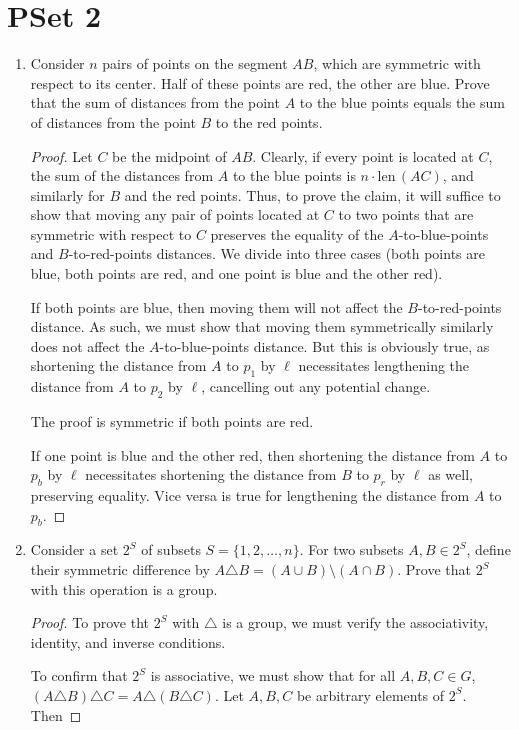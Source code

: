 \documentclass[../main.tex]{subfiles}
\begin{document}
\section{PSet 2}
\begin{enumerate}
    \item {}Consider $n$ pairs of points on the segment $AB$, which are symmetric with respect to its center. Half of these points are red, the other are blue. Prove that the sum of distances from the point $A$ to the blue points equals the sum of distances from the point $B$ to the red points.
    \begin{proof}
        Let $C$ be the midpoint of $AB$. Clearly, if every point is located at $C$, the sum of the distances from $A$ to the blue points is $n\cdot\text{len}\,(AC)$, and similarly for $B$ and the red points. Thus, to prove the claim, it will suffice to show that moving any pair of points located at $C$ to two points that are symmetric with respect to $C$ preserves the equality of the $A$-to-blue-points and $B$-to-red-points distances. We divide into three cases (both points are blue, both points are red, and one point is blue and the other red).\par
        If both points are blue, then moving them will not affect the $B$-to-red-points distance. As such, we must show that moving them symmetrically similarly does not affect the $A$-to-blue-points distance. But this is obviously true, as shortening the distance from $A$ to $p_1$ by $\ell$ necessitates lengthening the distance from $A$ to $p_2$ by $\ell$, cancelling out any potential change.\par
        The proof is symmetric if both points are red.\par
        If one point is blue and the other red, then shortening the distance from $A$ to $p_b$ by $\ell$ necessitates shortening the distance from $B$ to $p_r$ by $\ell$ as well, preserving equality. Vice versa is true for lengthening the distance from $A$ to $p_b$.
    \end{proof}
    \item Consider a set $2^S$ of subsets $S=\{1,2,\dots,n\}$. For two subsets $A,B\in 2^S$, define their symmetric difference by $A\triangle B=(A\cup B)\setminus(A\cap B)$. Prove that $2^S$ with this operation is a group.
    \begin{proof}
        To prove tht $2^S$ with $\triangle$ is a group, we must verify the associativity, identity, and inverse conditions.\par
        To confirm that $2^S$ is associative, we must show that for all $A,B,C\in G$, $(A\triangle B)\triangle C=A\triangle(B\triangle C)$. Let $A,B,C$ be arbitrary elements of $2^S$. Then

\end{proof}
\end{enumerate}
\end{document}

